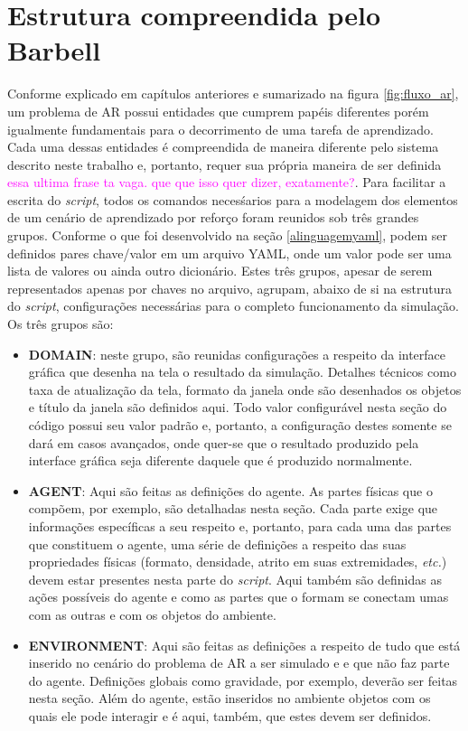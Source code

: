 \documentclass[cic,tc]{iiufrgs}
\newcommand\bruno[1]{\textcolor{magenta}{#1}}
\begin{document}
    \section{Estrutura compreendida pelo Barbell}
    Conforme explicado em capítulos anteriores e sumarizado na figura \ref{fig:fluxo_ar}, um problema de AR possui entidades que cumprem papéis diferentes porém
    igualmente fundamentais para o decorrimento de uma tarefa de aprendizado. Cada uma dessas entidades é compreendida de maneira diferente pelo sistema descrito
    neste trabalho e, portanto, requer sua própria maneira de ser definida \bruno{essa ultima frase ta vaga. que que isso quer dizer, exatamente?}. Para facilitar a escrita do \textit{script}, todos os comandos necesśarios para a modelagem
    dos elementos de um cenário de aprendizado por reforço foram reunidos sob três grandes grupos. Conforme o que foi desenvolvido na seção \ref{alinguagemyaml},
    podem ser definidos pares chave/valor em um arquivo YAML, onde um valor pode ser uma lista de valores ou ainda outro dicionário. Estes três grupos, apesar de serem
    representados apenas por chaves no arquivo, agrupam, abaixo de si na estrutura do \textit{script}, configurações necessárias para o completo funcionamento da simulação.
    Os três grupos são:
    \begin{itemize}
      \item \par{\textbf{DOMAIN}: neste grupo, são reunidas configurações a respeito da interface gráfica que desenha na tela o resultado da simulação.
      Detalhes técnicos como taxa de atualização da tela, formato da janela onde são desenhados os objetos e título da janela são definidos aqui. Todo valor
      configurável nesta seção do código possui seu valor padrão e, portanto, a configuração destes somente se dará em casos avançados, onde quer-se que o
      resultado produzido pela interface gráfica seja diferente daquele que é produzido normalmente.}
      \item \par{\textbf{AGENT}: Aqui são feitas as definições do agente. As partes físicas que o compõem, por exemplo, são detalhadas nesta seção. Cada parte exige que
      informações específicas a seu respeito e, portanto, para cada uma das partes que constituem o agente, uma série de definições a respeito das suas propriedades
      físicas (formato, densidade, atrito em suas extremidades, \textit{etc.}) devem estar presentes nesta parte do \textit{script}. Aqui também são definidas as
      ações possíveis do agente e como as partes que o formam se conectam umas com as outras e com os objetos do ambiente.}
      \item \par{\textbf{ENVIRONMENT}: Aqui são feitas as definições a respeito de tudo que está inserido no cenário do problema de AR a ser simulado e e que não faz parte do agente. Definições globais como
      gravidade, por exemplo, deverão ser feitas nesta seção. Além do agente, estão inseridos no ambiente objetos com os quais ele pode interagir e é aqui, também, que estes devem
      ser definidos.}
    \end{itemize}
\end{document}
